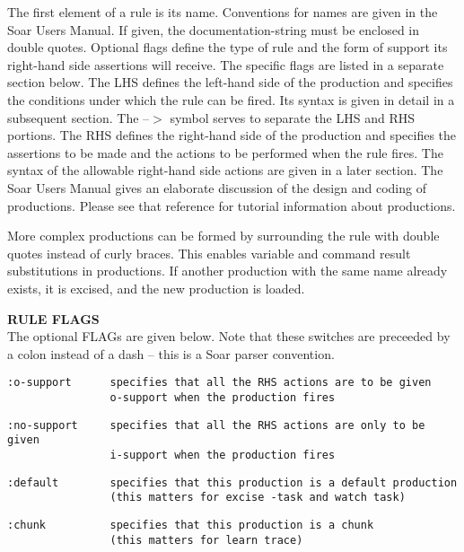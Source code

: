 \documentclass[10pt]{article}
\begin{document}
 The first element of a rule is its name. Conventions for names are given in the Soar Users Manual. If given, the documentation-string must be enclosed in double quotes. Optional flags define the type of rule and the form of support its right-hand side assertions will receive. The specific flags are listed in a separate section below. The LHS defines the left-hand side of the production and specifies the conditions under which the rule can be fired. Its syntax is given in detail in a subsequent section. The --$>$ symbol serves to separate the LHS and RHS portions. The RHS defines the right-hand side of the production and specifies the assertions to be made and the actions to be performed when the rule fires. The syntax of the allowable right-hand side actions are given in a later section. The Soar Users Manual gives an elaborate discussion of the design and coding of productions. Please see that reference for tutorial information about productions. 


  More complex productions can be formed by surrounding the rule with double quotes instead of curly braces. This enables variable and command result substitutions in productions. If another production with the same name already exists, it is excised, and the new production is loaded. 


 \textbf{RULE FLAGS}
\\ 



 The optional FLAGs are given below. Note that these switches are preceeded by a colon instead of a dash -- this is a Soar parser convention. \begin{verbatim}
:o-support      specifies that all the RHS actions are to be given
                o-support when the production fires 

\end{verbatim}
 \begin{verbatim}
:no-support     specifies that all the RHS actions are only to be given
                i-support when the production fires 

\end{verbatim}
 \begin{verbatim}
:default        specifies that this production is a default production 
                (this matters for excise -task and watch task) 

\end{verbatim}
 \begin{verbatim}
:chunk          specifies that this production is a chunk 
                (this matters for learn trace)

\end{verbatim}
\end{document}
